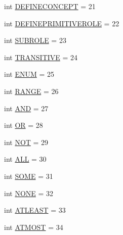 \begin{DoxyCompactItemize}
\item 
int \hyperlink{interfaceorg_1_1coode_1_1owl_1_1krssparser_1_1_k_r_s_s_parser_constants_ac2249c3b049e5050a12876faefe8adde}{D\-E\-F\-I\-N\-E\-C\-O\-N\-C\-E\-P\-T} = 21
\item 
int \hyperlink{interfaceorg_1_1coode_1_1owl_1_1krssparser_1_1_k_r_s_s_parser_constants_a39e23c133e1a4930adbc37bf7573ba93}{D\-E\-F\-I\-N\-E\-P\-R\-I\-M\-I\-T\-I\-V\-E\-R\-O\-L\-E} = 22
\item 
int \hyperlink{interfaceorg_1_1coode_1_1owl_1_1krssparser_1_1_k_r_s_s_parser_constants_afd7c07cfa548206ad3a7b50d06a1a3e3}{S\-U\-B\-R\-O\-L\-E} = 23
\item 
int \hyperlink{interfaceorg_1_1coode_1_1owl_1_1krssparser_1_1_k_r_s_s_parser_constants_a1906a01869b30f239d0b515803505284}{T\-R\-A\-N\-S\-I\-T\-I\-V\-E} = 24
\item 
int \hyperlink{interfaceorg_1_1coode_1_1owl_1_1krssparser_1_1_k_r_s_s_parser_constants_a3f9030308e39e32c2a36f46302fc9f8a}{E\-N\-U\-M} = 25
\item 
int \hyperlink{interfaceorg_1_1coode_1_1owl_1_1krssparser_1_1_k_r_s_s_parser_constants_a938be8f90520d45cf1635e6c3c3cf9ea}{R\-A\-N\-G\-E} = 26
\item 
int \hyperlink{interfaceorg_1_1coode_1_1owl_1_1krssparser_1_1_k_r_s_s_parser_constants_a7cc41deac4c9539a6bca22d16c327be5}{A\-N\-D} = 27
\item 
int \hyperlink{interfaceorg_1_1coode_1_1owl_1_1krssparser_1_1_k_r_s_s_parser_constants_ab5221109542a05fff70af2ee5307b5ed}{O\-R} = 28
\item 
int \hyperlink{interfaceorg_1_1coode_1_1owl_1_1krssparser_1_1_k_r_s_s_parser_constants_a4592f104545aa88b0efe88d993e7f469}{N\-O\-T} = 29
\item 
int \hyperlink{interfaceorg_1_1coode_1_1owl_1_1krssparser_1_1_k_r_s_s_parser_constants_a586d9f8a638ab74683e2390f71995e16}{A\-L\-L} = 30
\item 
int \hyperlink{interfaceorg_1_1coode_1_1owl_1_1krssparser_1_1_k_r_s_s_parser_constants_a8efcc6d2950e598aad10671a123f13cf}{S\-O\-M\-E} = 31
\item 
int \hyperlink{interfaceorg_1_1coode_1_1owl_1_1krssparser_1_1_k_r_s_s_parser_constants_a63e138eb33fdf595859b3fbf0b0c01d5}{N\-O\-N\-E} = 32
\item 
int \hyperlink{interfaceorg_1_1coode_1_1owl_1_1krssparser_1_1_k_r_s_s_parser_constants_a398ad547cf04e025739c4e3c963a4591}{A\-T\-L\-E\-A\-S\-T} = 33
\item 
int \hyperlink{interfaceorg_1_1coode_1_1owl_1_1krssparser_1_1_k_r_s_s_parser_constants_ab2cf6014de34869db0c88ca705dc59ef}{A\-T\-M\-O\-S\-T} = 34

\end{DoxyCompactItemize}
